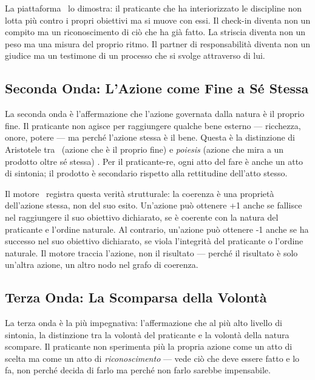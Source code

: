 La piattaforma \praxis\ lo dimostra: il praticante che ha interiorizzato
le discipline non lotta pi\`u contro i propri obiettivi ma si muove con
essi. Il check-in diventa non un compito ma un riconoscimento di ci\`o
che ha gi\`a fatto. La striscia diventa non un peso ma una misura del
proprio ritmo. Il partner di responsabilit\`a diventa non un giudice ma
un testimone di un processo che si svolge attraverso di lui.

\subsection{Seconda Onda: L'Azione come Fine a S\'e Stessa}

La seconda onda \`e l'affermazione che l'azione governata dalla natura
\`e il proprio fine. Il praticante non agisce per raggiungere qualche
bene esterno --- ricchezza, onore, potere --- ma perch\'e l'azione
stessa \`e il bene. Questa \`e la distinzione di Aristotele tra \praxis\
(azione che \`e il proprio fine) e \emph{poiesis} (azione che mira a
un prodotto oltre s\'e stessa) \parencite[VI.4]{aristotle2000ethics}. Per
il praticante-re, ogni atto del fare \`e anche un atto di sintonia; il
prodotto \`e secondario rispetto alla rettitudine dell'atto stesso.

Il motore \physis\ registra questa verit\`a strutturale: la coerenza
\`e una propriet\`a dell'azione stessa, non del suo esito. Un'azione
pu\`o ottenere +1 anche se fallisce nel raggiungere il suo obiettivo
dichiarato, se \`e coerente con la natura del praticante e l'ordine
naturale. Al contrario, un'azione pu\`o ottenere -1 anche se ha successo
nel suo obiettivo dichiarato, se viola l'integrit\`a del praticante o
l'ordine naturale. Il motore traccia l'azione, non il risultato ---
perch\'e il risultato \`e solo un'altra azione, un altro nodo nel grafo
di coerenza.

\subsection{Terza Onda: La Scomparsa della Volont\`a}

La terza onda \`e la pi\`u impegnativa: l'affermazione che al pi\`u
alto livello di sintonia, la distinzione tra la volont\`a del praticante
e la volont\`a della natura scompare. Il praticante non sperimenta pi\`u
la propria azione come un atto di scelta ma come un atto di
\emph{riconoscimento} --- vede ci\`o che deve essere fatto e lo fa,
non perch\'e decida di farlo ma perch\'e non farlo sarebbe impensabile.

